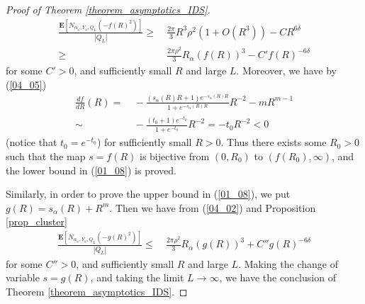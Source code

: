 \documentclass[10pt,a4paper]{amsart}
\begin{document}
\begin{proof}[Proof of Theorem \ref{theorem_asymptotics_IDS}]
\begin{align*}
 \frac{\mathbf{E}[N_{\alpha_\omega,Y_\omega,Q_L}(-f(R)^2)]}{|Q_L|}
\geq&\ 
\frac{2\pi}{3}R^3\rho^2(1+O(R^3))
- C R^{6\delta}\\
\geq &\ 
\frac{2\pi\rho^2}{3}R_\alpha(f(R))^3 - C' f(R)^{-6\delta}
\end{align*}
for some $C'>0$,
 and sufficiently small $R$ and large $L$.
Moreover,
we have by (\ref{04_05})
\begin{align*}
\frac{df}{dR}(R)
=&\ 
-
\frac{(s_\alpha(R)R+1)e^{-s_\alpha(R)R}}{ 1+e^{-s_\alpha(R)R}}R^{-2}
 - mR^{m-1}\\
\sim&\ 
-\frac{(t_0+1)e^{-t_0}}{ 1+e^{-t_0}}R^{-2}
=-t_0 R^{-2}
<0
\end{align*}
(notice that $t_0=e^{-t_0}$) for sufficiently small $R>0$.
Thus 
there exists some $R_0>0$ such that
the map $s=f(R)$ is 
bijective from $(0,R_0)$ to $(f(R_0),\infty)$,
and the lower bound in (\ref{01_08}) is proved.


Similarly, in order to prove the upper bound in (\ref{01_08}),
we put $g(R)=s_\alpha(R)+R^m$.
Then we have from (\ref{04_02}) and Proposition \ref{prop_cluster}
\begin{align*}
\frac{\mathbf{E}[N_{\alpha_\omega,Y_\omega,Q_L}(-g(R)^2)]}{|Q_L|}
\leq &\ 
\frac{2\pi\rho^2}{3}R_\alpha(g(R))^3 + C'' g(R)^{-6\delta}
\end{align*}
for some $C''>0$,
 and sufficiently small $R$ and large $L$.
Making the change of variable $s=g(R)$,
and taking the limit $L\to \infty$,
we have the conclusion of Theorem \ref{theorem_asymptotics_IDS}.
\end{proof}
\end{document}
